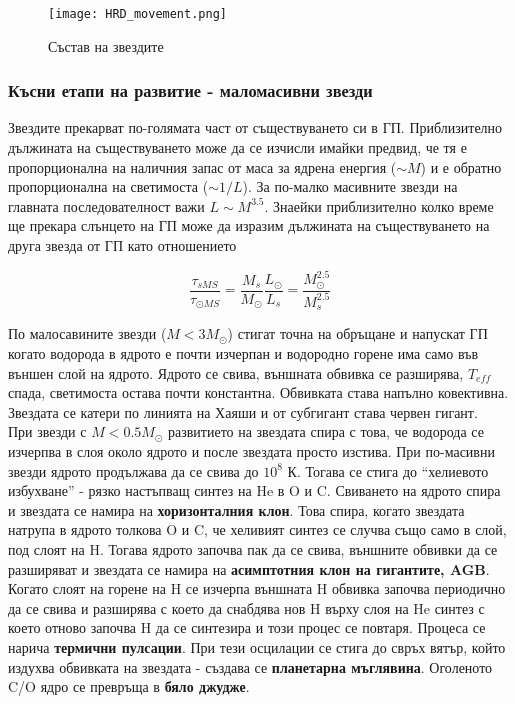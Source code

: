\documentclass[a4paper,12pt]{article}
\begin{document}
\begin{figure}[h!]
\centering
\texttt{[image: HRD\_movement.png]}
\caption{Състав на звездите}
\label{fig:HRD_movement}
\end{figure}

\subsubsection{Късни етапи на развитие - маломасивни звезди}
Звездите прекарват по-голямата част от съществуването си в ГП. Приблизително дължината на съществуването може да се изчисли имайки предвид, че тя е пропорционална на наличния запас от маса за ядрена енергия ($\sim M$) и е обратно пропорционална на светимоста ($\sim 1/L$). За по-малко масивните звезди на главната последователност важи $L \sim M^{3.5}$. Знаейки приблизително колко време ще прекара слънцето на ГП може да изразим дължината на съществуването на друга звезда от ГП като отношението

\begin{equation}
    \frac{\tau_{sMS}}{\tau_{\odot MS}} = \frac{M_s}{M_\odot} \frac{L_\odot}{L_s} = \frac{M_\odot^{2.5}}{M_s^{2.5}} 
\end{equation}

По малосавините звезди ($M<3M_\odot$) стигат точна на обръщане и напускат ГП когато водорода в ядрото е почти изчерпан и водородно горене има само във външен слой на ядрото. Ядрото се свива, външната обвивка се разширява, $T_{eff}$ спада, светимоста остава почти константна. Обвивката става напълно ковективна. Звездата се катери по линията на Хаяши и от субгигант става червен гигант.\\

При звезди с $M<0.5M_\odot$ развитието на звездата спира с това, че водорода се изчерпва в слоя около ядрото и после звездата просто изстива. При по-масивни звезди ядрото продължава да се свива до $10^8$ К. Тогава се стига до ``хелиевото избухване'' - рязко настъпващ синтез на He в O и C. Свиването на ядрото спира и звездата се намира на \textbf{хоризонталния клон}. Това спира, когато звездата натрупа в ядрото толкова O и C, че хеливият синтез се случва също само в слой, под слоят на H. Тогава ядрото започва пак да се свива, външните обвивки да се разширяват и звездата се намира на \textbf{асимптотния клон на гигантите, AGB}. Когато слоят на горене на H се изчерпа външната H обвивка започва периодично да се свива и разширява с което да снабдява нов H върху слоя на He синтез с което отново започва H да се синтезира и този процес се повтаря. Процеса се нарича \textbf{термични пулсации}. При тези осцилации се стига до свръх вятър, който издухва обвивката на звездата - създава се \textbf{планетарна мъглявина}. Оголеното C/O ядро се превръща в \textbf{бяло джудже}.
\end{document}
